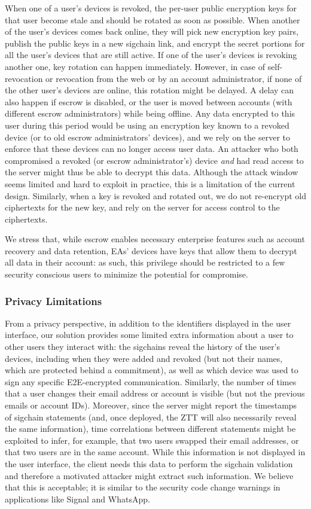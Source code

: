 When one of a user's devices is revoked, the per-user public encryption keys for that user become
stale and should be rotated as soon as possible. When another of the user's devices comes back
online, they will pick new encryption key pairs, publish the public keys in a new sigchain link, and
encrypt the secret portions for all the user's devices that are still active. If one of the user's
devices is revoking another one, key rotation can happen immediately. However, in case of
self-revocation or revocation from the web or by an account administrator, if none of the other
user's devices are online, this rotation might be delayed. A delay can also happen if escrow is
disabled, or the user is moved between accounts (with different escrow administrators) while being
offline. Any data encrypted to this user during this period would be using an encryption key known
to a revoked device (or to old escrow administrators' devices), and we rely on the server to enforce
that these devices can no longer access user data. An attacker who both compromised a revoked (or
escrow administrator's) device \textit{and} had read access to the server might thus be able to
decrypt this data. Although the attack window seems limited and hard to exploit in practice, this is
a limitation of the current design. Similarly, when a key is revoked and rotated out, we do not
re-encrypt old ciphertexts for the new key, and rely on the server for access control to the
ciphertexts.

We stress that, while escrow enables necessary enterprise features such as account recovery and data
retention, EAs' devices have keys that allow them to decrypt all data in their account: as such,
this privilege should be restricted to a few security conscious users to minimize the potential for
compromise.

\subsubsection{Privacy Limitations}

From a privacy perspective, in addition to the identifiers displayed in the user interface, our
solution provides some limited extra information about a user to other users they interact with: the
sigchains reveal the history of the user's devices, including when they were added and revoked (but
not their names, which are protected behind a commitment), as well as which device was used to sign
any specific E2E-encrypted communication. Similarly, the number of times that a user changes their
email address or account is visible (but not the previous emails or account IDs). Moreover, since
the server might report the timestamps of sigchain statements (and, once deployed, the ZTT will also
necessarily reveal the same information), time correlations between different statements might be
exploited to infer, for example, that two users swapped their email addresses, or that two users are
in the same account. While this information is not displayed in the user interface, the client needs
this data to perform the sigchain validation and therefore a motivated attacker might extract such
information. We believe that this is acceptable; it is similar to the security code change warnings
in applications like Signal and WhatsApp.

